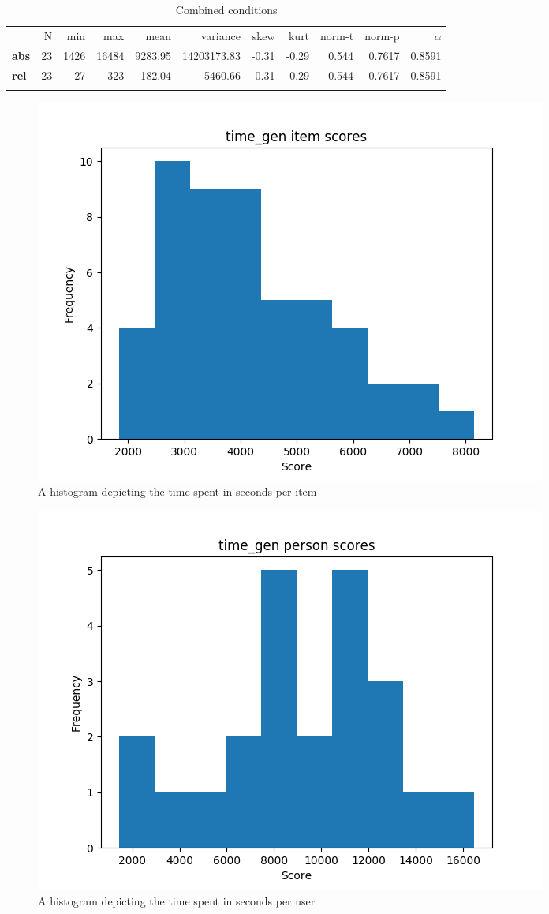 \begin{longtable}[c]{@{}lrrrrrrrrrr@{}}
\caption{Combined conditions}
\endfirsthead
\toprule\addlinespace
& N & min & max & mean & variance & skew & kurt & norm-t &
norm-p & $\alpha$
\\\addlinespace
\midrule
\textbf{abs} & 23 & 1426 & 16484 & 9283.95 & 14203173.83 & -0.31 & -0.29
& 0.544 & 0.7617 & 0.8591
\\\addlinespace
\textbf{rel} & 23 & 27 & 323 & 182.04 & 5460.66 & -0.31 & -0.29 & 0.544
& 0.7617 & 0.8591
\\\addlinespace
\bottomrule
    \label{tab:time_gen}
\end{longtable}

\begin{figure}
    \centering
    \includegraphics[width=.7\textwidth]{img/time_gen_diff.png}
    \caption{A histogram depicting the time spent in seconds per item} 
    \label{fig:time_gen_diff}
\end{figure}
\begin{figure}
    \centering
    \includegraphics[width=.7\textwidth]{img/time_gen_abil.png}
    \caption{A histogram depicting the time spent in seconds per user}
    \label{fig:time_gen_abil}
\end{figure}

